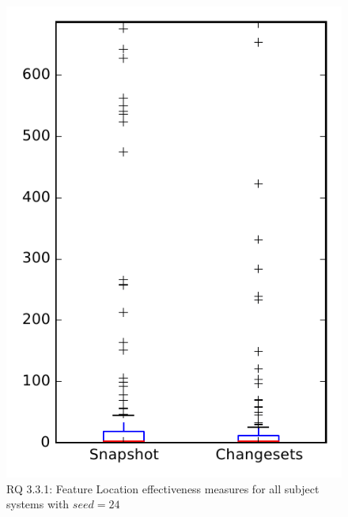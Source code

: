 
\begin{figure}
\centering
\includegraphics[height=0.4\textheight]{figures/flt_seed/rq1_overview_24}
\caption{RQ 3.3.1: Feature Location effectiveness measures for all subject systems with $seed=24$}
\label{fig:flt_seed:rq1:overview}
\end{figure}
